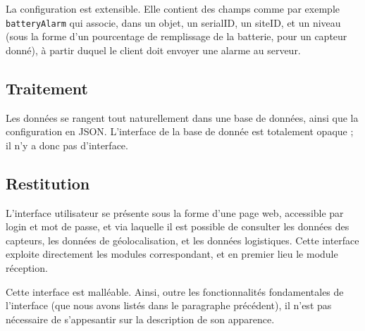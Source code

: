 La configuration est extensible. Elle contient des champs comme par exemple \texttt{batteryAlarm} qui associe, dans un objet, un serialID, un siteID, et un niveau (sous la forme d'un pourcentage de remplissage de la batterie, pour un capteur donné), à partir duquel le client doit envoyer une alarme au serveur.

\subsection{Traitement}

Les données se rangent tout naturellement dans une base de données, ainsi que la configuration en JSON. L'interface de la base de donnée est totalement opaque ; il n'y a donc pas d'interface.

\subsection{Restitution}

L'interface utilisateur se présente sous la forme d'une page web, accessible par login et mot de passe, et via laquelle il est possible de consulter les données des capteurs, les données de géolocalisation, et les données logistiques. Cette interface exploite directement les modules correspondant, et en premier lieu le module réception.

Cette interface est malléable. Ainsi, outre les fonctionnalités fondamentales de l'interface (que nous avons listés dans le paragraphe précédent), il n'est pas nécessaire de s'appesantir sur la description de son apparence.

